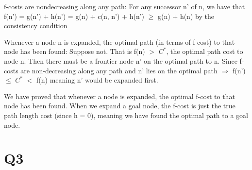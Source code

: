 \documentclass[11pt,a4paper]{article}
\begin{document}
f-costs are nondecreasing along any path: For any successor n' of n, we have that f(n') = g(n') + h(n') = g(n) + c(n, n') + h(n') $\geq$ g(n) + h(n) by the consistency condition

Whenever a node n is expanded, the optimal path (in terms of f-cost) to that node has been found: Suppose not. That is f(n) $>$ $C^{*}$, the optimal path cost to node n. Then there must be a frontier node n' on the optimal path to n. Since f-costs are non-decreasing along any path and n' lies on the optimal path $\Rightarrow$ f(n') $\leq$ $C^{*}$ $<$ f(n) meaning n' would be expanded first. 

We have proved that whenever a node is expanded, the optimal f-cost to that node has been found. When we expand a goal node, the f-cost is just the true path length cost (since h = 0), meaning we have found the optimal path to a goal node. 

\section*{Q3}


 
\end{document}
